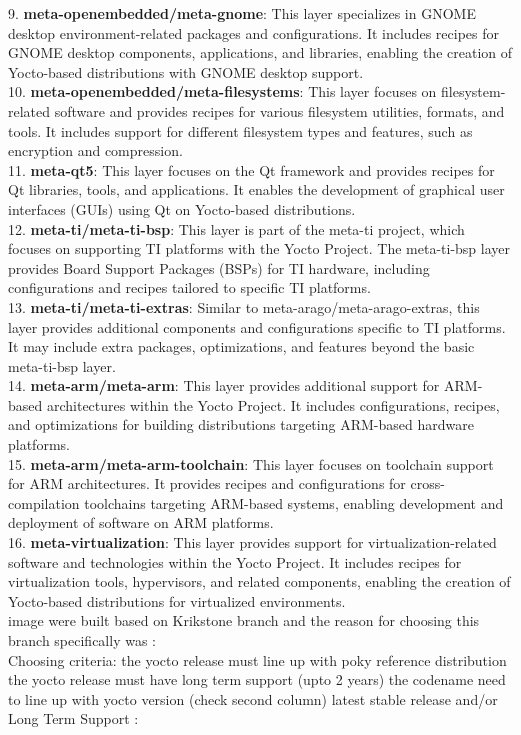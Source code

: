 \begin{itemize}
9.	\textbf{meta-openembedded/meta-gnome}: This layer specializes in GNOME desktop environment-related packages and configurations. It includes recipes for GNOME desktop components, applications, and libraries, enabling the creation of Yocto-based distributions with GNOME desktop support. \\
10.	\textbf{meta-openembedded/meta-filesystems}: This layer focuses on filesystem-related software and provides recipes for various filesystem utilities, formats, and tools. It includes support for different filesystem types and features, such as encryption and compression. \\
11.	\textbf{meta-qt5}: This layer focuses on the Qt framework and provides recipes for Qt libraries, tools, and applications. It enables the development of graphical user interfaces (GUIs) using Qt on Yocto-based distributions. \\
12.	\textbf{meta-ti/meta-ti-bsp}: This layer is part of the meta-ti project, which focuses on supporting TI platforms with the Yocto Project. The meta-ti-bsp layer provides Board Support Packages (BSPs) for TI hardware, including configurations and recipes tailored to specific TI platforms. \\
13.	\textbf{meta-ti/meta-ti-extras}: Similar to meta-arago/meta-arago-extras, this layer provides additional components and configurations specific to TI platforms. It may include extra packages, optimizations, and features beyond the basic meta-ti-bsp layer. \\
14.	\textbf{meta-arm/meta-arm}: This layer provides additional support for ARM-based architectures within the Yocto Project. It includes configurations, recipes, and optimizations for building distributions targeting ARM-based hardware platforms. \\
15.	\textbf{meta-arm/meta-arm-toolchain}: This layer focuses on toolchain support for ARM architectures. It provides recipes and configurations for cross-compilation toolchains targeting ARM-based systems, enabling development and deployment of software on ARM platforms. \\
16.	\textbf{meta-virtualization}: This layer provides support for virtualization-related software and technologies within the Yocto Project. It includes recipes for virtualization tools, hypervisors, and related components, enabling the creation of Yocto-based distributions for virtualized environments. \\

image were built based on Krikstone branch and the reason for choosing this branch specifically was : \\
Choosing criteria:
the yocto release must line up with poky reference distribution
the yocto release must have long term support (upto 2 years)
the codename need to line up with yocto version (check second column)
latest stable release and/or Long Term Support : \\



\end{itemize}
